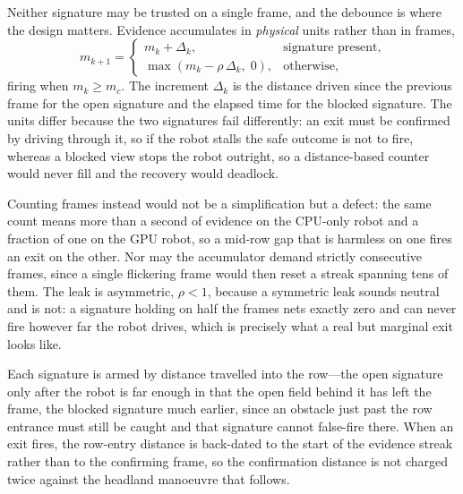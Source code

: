 \documentclass[conference]{IEEEtran}
\begin{document}
Neither signature may be trusted on a single frame, and the debounce is where
the design matters. Evidence accumulates in \emph{physical} units rather than in
frames,
\begin{equation}
m_{k+1} =
\begin{cases}
  m_k + \Delta_k, & \text{signature present},\\[2pt]
  \max\!\left(m_k - \rho\,\Delta_k,\; 0\right), & \text{otherwise},
\end{cases}
\label{eq:accumulator}
\end{equation}
firing when $m_k \ge m_c$. The increment $\Delta_k$ is the distance driven since
the previous frame for the open signature and the elapsed time for the blocked
signature. The units differ because the two signatures fail differently: an exit
must be confirmed by driving through it, so if the robot stalls the safe outcome
is not to fire, whereas a blocked view stops the robot outright, so a
distance-based counter would never fill and the recovery would deadlock.

Counting frames instead would not be a simplification but a defect: the same
count means more than a second of evidence on the CPU-only robot and a fraction
of one on the GPU robot, so a mid-row gap that is harmless on one fires an exit
on the other. Nor may the accumulator demand strictly consecutive frames, since
a single flickering frame would then reset a streak spanning tens of them. The
leak is asymmetric, $\rho<1$, because a symmetric leak sounds neutral and is
not: a signature holding on half the frames nets exactly zero and can never fire
however far the robot drives, which is precisely what a real but marginal exit
looks like.

Each signature is armed by distance travelled into the row---the open signature
only after the robot is far enough in that the open field behind it has left the
frame, the blocked signature much earlier, since an obstacle just past the row
entrance must still be caught and that signature cannot false-fire there. When
an exit fires, the row-entry distance is back-dated to the start of the evidence
streak rather than to the confirming frame, so the confirmation distance is not
charged twice against the headland manoeuvre that follows.
\end{document}
